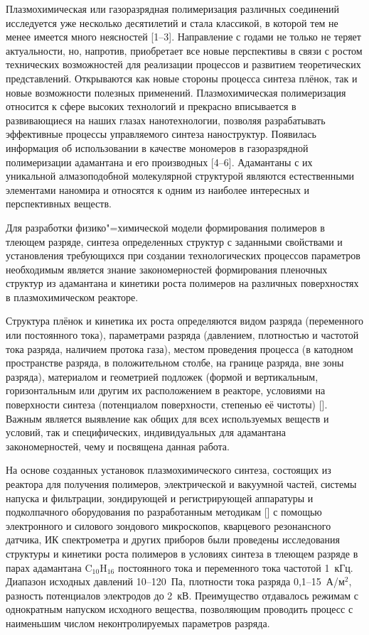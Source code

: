 Плазмохимическая или газоразрядная полимеризация различных
соединений исследуется уже несколько десятилетий и стала
классикой, в которой тем не менее имеется много неясностей
[1--3]. Направление с годами не только не теряет актуальности, но,
напротив, приобретает все новые перспективы в связи с ростом
технических возможностей для реализации процессов и развитием
теоретических представлений. Открываются как новые стороны
процесса синтеза плёнок, так и новые возможности полезных
применений. Плазмохимическая полимеризация относится к сфере
высоких технологий  и прекрасно вписывается в развивающиеся на
наших глазах нанотехнологии, позволяя разрабатывать эффективные
процессы управляемого синтеза наноструктур. Появилась информация
об использовании в качестве мономеров в газоразрядной
полимеризации адамантана и его производных [4--6]. Адамантаны с их
уникальной алмазоподобной молекулярной структурой являются
естественными элементами наномира и относятся к одним из
наиболее интересных и перспективных  веществ.

Для разработки физико"=химической модели формирования полимеров в
тлеющем разряде, синтеза определенных структур с заданными
свойствами и установления требующихся при создании технологических
процессов параметров необходимым является знание закономерностей
формирования пленочных структур из адамантана и кинетики роста
полимеров на различных поверхностях в плазмохимическом реакторе.

Структура плёнок и кинетика их роста определяются видом разряда
(переменного или постоянного тока), параметрами разряда
(давлением, плотностью и частотой тока разряда, наличием протока
газа), местом проведения процесса (в катодном пространстве
разряда, в положительном столбе, на границе разряда, вне зоны
разряда), материалом и геометрией подложек (формой и вертикальным,
горизонтальным или другим их расположением в реакторе, условиями
на поверхности синтеза (потенциалом поверхности, степенью её
чистоты) []. Важным является выявление
как общих для всех используемых веществ и условий, так и
специфических, индивидуальных для адамантана закономерностей,
чему и посвящена данная работа.

\smallskip

 На основе созданных установок
плазмохимического синтеза, состоящих из реактора для получения
полимеров, электрической и вакуумной частей, системы напуска и
фильтрации, зондирующей и регистрирующей аппаратуры и
подколпачного оборудования по разработанным методикам
[] с помощью
электронного и силового зондового микроскопов, кварцевого
резонансного датчика, ИК спектрометра и других приборов были
проведены исследования структуры и  кинетики роста полимеров в
условиях синтеза в тлеющем разряде в парах адамантана
$\text{C}_{10} \text{H}_{16}$ постоянного тока и переменного тока
частотой 1~кГц. Диапазон исходных давлений 10–120~Па, плотности
тока разряда 0,1–15~А/м$^2$, разность потенциалов электродов до
2~кВ. Преимущество отдавалось режимам с однократным напуском
исходного вещества, позволяющим проводить процесс с наименьшим
числом неконтролируемых параметров разряда.

